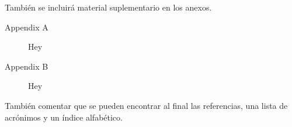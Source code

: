 También se incluirá material suplementario en los anexos.

\begin{description}
  \item[Appendix A] Hey
  \item[Appendix B] Hey
\end{description}

También comentar que se pueden encontrar al final las referencias, una lista de
acrónimos y un índice alfabético.
